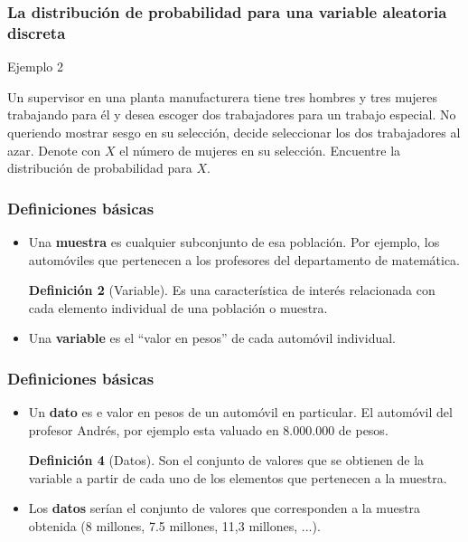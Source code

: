 \documentclass[10pt]{beamer}
\theoremstyle{plain} %
\theoremstyle{definition}
\newtheorem{defn}{Definición}
\theoremstyle{remark}
\newcommand{\ejem}[2]{
\begin{exampleblock}{Ejemplo #1}
\justifying
#2
\end{exampleblock}
}
\begin{document}
\begin{frame}
    \justifying
    \frametitle{La distribución de probabilidad para una variable aleatoria discreta}
    \ejem{2}{
        Un supervisor en una planta manufacturera tiene tres hombres y tres mujeres trabajando para 
        él y desea escoger dos trabajadores para un trabajo especial. No queriendo mostrar sesgo en 
        su selección, decide seleccionar los dos trabajadores al azar. Denote con $X$ el número de mujeres en su selección. 
        Encuentre la distribución de probabilidad para $X$.
    }
    \end{frame}



\begin{frame}
\frametitle{Definiciones básicas}
\begin{itemize}[<+->]
\justifying
\begin{defn}[Muestra]
Es el subconjunto de la población.
\end{defn}

\item Una \textbf{muestra} es cualquier subconjunto de esa población. Por ejemplo, los automóviles que pertenecen a los profesores del departamento de matemática.

\begin{defn}[Variable]
Es una característica de interés relacionada con cada elemento individual de una población o muestra.
\end{defn}

\item Una \textbf{variable} es el ``valor en pesos'' de cada automóvil individual.
\end{itemize}
\end{frame}



\begin{frame}
\frametitle{Definiciones básicas}
\begin{itemize}[<+->]
\justifying
\begin{defn}[Dato]
Es el valor de la variable asociada a un elemento de una población o muestra. Este valor puede ser un número, una palabra o un símbolo.
\end{defn}

\item Un \textbf{dato} es e valor en pesos de un automóvil en particular. El automóvil del profesor Andrés, por ejemplo esta valuado en 8.000.000 de pesos.

\begin{defn}[Datos]
Son el conjunto de valores que se obtienen de la variable a partir de cada uno de los elementos que pertenecen a la muestra.
\end{defn}

\item Los \textbf{datos} serían el conjunto de valores que corresponden a la muestra obtenida (8 millones, 7.5 millones, 11,3 millones, ...).
\end{itemize}
\end{frame}
\end{document}
